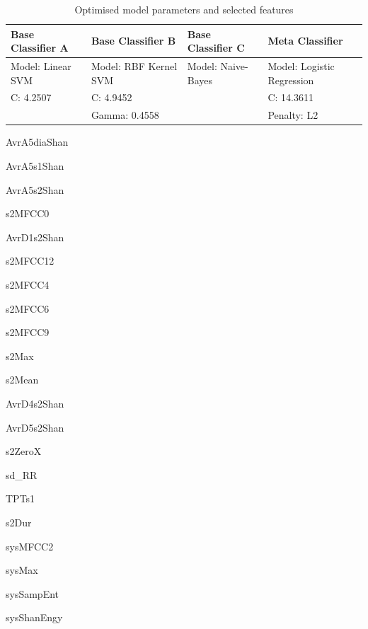 \documentclass[titlepage, 12pt]{scrartcl} \usepackage{enumitem}
\begin{document}
\renewenvironment{itemize}{
  \begin{list}{}{
    \setlength{\leftmargin}{1.5em}
    \setlength{\itemsep}{0.25em}
    \setlength{\parskip}{0pt}
    \setlength{\parsep}{0.25em}
  }
}{
  \end{list}
}

\begin{table}[H]
\centering
\caption{Optimised model parameters and selected features}
\scriptsize
\label{OpParam}
\begin{tabulary}{\linewidth}{LLLL}
\toprule
Base Classifier A & Base Classifier B     & Base Classifier C  & Meta Classifier            \\ \midrule
Model: Linear SVM & Model: RBF Kernel SVM & Model: Naive-Bayes & Model: Logistic Regression \\
C: 4.2507         & C: 4.9452             &                    & C: 14.3611                 \\
                  & Gamma: 0.4558         &                    & Penalty: L2                \\ \bottomrule
\end{tabulary}
\singlespacing
\begin{multicols}{5}
    \scriptsize
\begin{itemize}
    \item AvrA5diaShan
    \item AvrA5s1Shan
    \item AvrA5s2Shan
    \item s2MFCC0
    \item AvrD1s2Shan
    \item s2MFCC12
    \item s2MFCC4
    \item s2MFCC6
    \item s2MFCC9
    \item s2Max
    \item s2Mean
    \item AvrD4s2Shan
    \item AvrD5s2Shan
    \item s2ZeroX
    \item sd\_RR
    \item TPTs1
    \item s2Dur
    \item sysMFCC2
    \item sysMax
    \item sysSampEnt
    \item sysShanEngy

\end{itemize}
\end{multicols}
\end{table}
\end{document}
